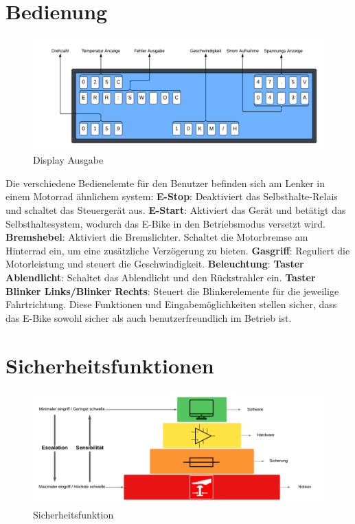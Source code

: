 \documentclass[paper=a4,11pt]{scrreprt}
\begin{document}
\section{Bedienung}

\begin{figure}[ht]
\begin{center}
\includegraphics[width=14cm]{Bilder/Display.PNG}
\caption{Display Ausgabe}
\label{display}
\end{center}
\end{figure}

Die verschiedene Bedienelemte für den Benutzer befinden sich am Lenker in einem Motorrad ähnlichem system:
\textbf{E-Stop}: Deaktiviert das Selbsthalte-Relais und schaltet das Steuergerät aus.
\textbf{E-Start}: Aktiviert das Gerät und betätigt das Selbsthaltesystem, wodurch das E-Bike in den Betriebsmodus versetzt wird.
\textbf{Bremshebel}:
Aktiviert die Bremslichter.
Schaltet die Motorbremse am Hinterrad ein, um eine zusätzliche Verzögerung zu bieten.
\textbf{Gasgriff}: Reguliert die Motorleistung und steuert die Geschwindigkeit.
\textbf{Beleuchtung}:
\textbf{Taster Ablendlicht}: Schaltet das Ablendlicht und den Rückstrahler ein.
\textbf{Taster Blinker Links/Blinker Rechts}: Steuert die Blinkerelemente für die jeweilige Fahrtrichtung.
Diese Funktionen und Eingabemöglichkeiten stellen sicher, dass das E-Bike sowohl sicher als auch benutzerfreundlich im Betrieb ist.\\

\newpage
\section{Sicherheitsfunktionen}

\begin{figure}[ht]
\begin{center}
\includegraphics[width=13cm]{Bilder/Safety.PNG}
\caption{Sicherheitsfunktion}
\label{safety}
\end{center}
\end{figure}
\end{document}
